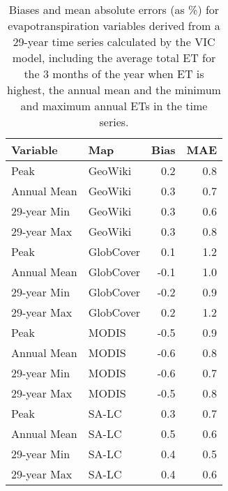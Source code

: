 \begin{longtable}{llrr}
\caption{Biases and mean absolute errors (as \%) for evapotranspiration variables derived from a 29-year time series calculated by the VIC model, including the average total ET for the 3 months of the year when ET is highest, the annual mean and the minimum and maximum annual ETs in the time series.} \\ 
  \hline
Variable & Map & Bias & MAE \\ 
  \hline
Peak & GeoWiki & 0.2 & 0.8 \\ 
  Annual Mean & GeoWiki & 0.3 & 0.7 \\ 
  29-year Min & GeoWiki & 0.3 & 0.6 \\ 
  29-year Max & GeoWiki & 0.3 & 0.8 \\ 
  Peak & GlobCover & 0.1 & 1.2 \\ 
  Annual Mean & GlobCover & -0.1 & 1.0 \\ 
  29-year Min & GlobCover & -0.2 & 0.9 \\ 
  29-year Max & GlobCover & 0.2 & 1.2 \\ 
  Peak & MODIS & -0.5 & 0.9 \\ 
  Annual Mean & MODIS & -0.6 & 0.8 \\ 
  29-year Min & MODIS & -0.6 & 0.7 \\ 
  29-year Max & MODIS & -0.5 & 0.8 \\ 
  Peak & SA-LC & 0.3 & 0.7 \\ 
  Annual Mean & SA-LC & 0.5 & 0.6 \\ 
  29-year Min & SA-LC & 0.4 & 0.5 \\ 
  29-year Max & SA-LC & 0.4 & 0.6 \\ 
   \hline
\hline
\end{longtable}
